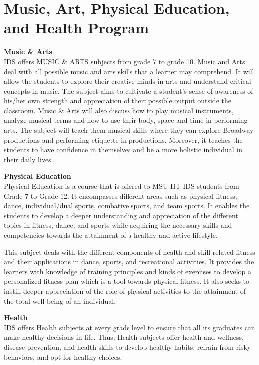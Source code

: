 \section{Music, Art, Physical Education, and Health Program}

\textbf{Music \& Arts} \\
IDS offers MUSIC \& ARTS subjects from grade 7 to grade 10. Music and Arts deal with all possible music and arts skills that a learner may comprehend. It will allow the students to explore their creative minds in arts and understand critical concepts in music. The subject aims to cultivate a student's sense of awareness of his/her own strength and appreciation of their possible output outside the classroom. Music \& Arts will also discuss how to play musical instruments, analyze musical terms and how to use their body, space and time in performing arts. The subject will teach them musical skills where they can explore Broadway productions and performing etiquette in productions. Moreover, it teaches the students to have confidence in themselves and be a more holistic individual in their daily lives. 

\textbf{Physical Education} \\
Physical Education is a course that is offered to MSU-IIT IDS students from Grade 7 to Grade 12. It encompasses different areas such as physical fitness, dance, individual/dual sports, combative sports, and team sports. It enables the students to develop a deeper understanding and appreciation of the different topics in fitness, dance, and sports while acquiring the necessary skills and competencies towards the attainment of a healthy and active lifestyle. 

This subject deals with the different components of health and skill related fitness and their applications in dance, sports, and recreational activities. It provides the learners with knowledge of training principles and kinds of exercises to develop a personalized fitness plan which is a tool towards physical fitness. It also seeks to instill deeper appreciation of the role of physical activities to the attainment of the total well-being of an individual. 

\textbf{Health} \\
IDS offers Health subjects at every grade level to ensure that all its graduates can make healthy decisions in life. Thus, Health subjects offer health and wellness, disease prevention, and health skills to develop healthy habits, refrain from risky behaviors, and opt for healthy choices.


